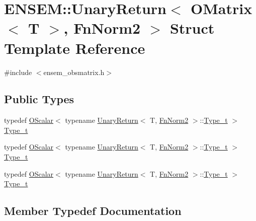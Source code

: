\hypertarget{structENSEM_1_1UnaryReturn_3_01OMatrix_3_01T_01_4_00_01FnNorm2_01_4}{}\section{E\+N\+S\+EM\+:\+:Unary\+Return$<$ O\+Matrix$<$ T $>$, Fn\+Norm2 $>$ Struct Template Reference}
\label{structENSEM_1_1UnaryReturn_3_01OMatrix_3_01T_01_4_00_01FnNorm2_01_4}


{\ttfamily \#include $<$ensem\+\_\+obsmatrix.\+h$>$}

\subsection*{Public Types}
\begin{DoxyCompactItemize}
\item 
typedef \mbox{\hyperlink{classENSEM_1_1OScalar}{O\+Scalar}}$<$ typename \mbox{\hyperlink{structENSEM_1_1UnaryReturn}{Unary\+Return}}$<$ T, \mbox{\hyperlink{structENSEM_1_1FnNorm2}{Fn\+Norm2}} $>$\+::\mbox{\hyperlink{structENSEM_1_1UnaryReturn_3_01OMatrix_3_01T_01_4_00_01FnNorm2_01_4_a4ec82ac7d8a71ef886cafde5b7ecff03}{Type\+\_\+t}} $>$ \mbox{\hyperlink{structENSEM_1_1UnaryReturn_3_01OMatrix_3_01T_01_4_00_01FnNorm2_01_4_a4ec82ac7d8a71ef886cafde5b7ecff03}{Type\+\_\+t}}
\item 
typedef \mbox{\hyperlink{classENSEM_1_1OScalar}{O\+Scalar}}$<$ typename \mbox{\hyperlink{structENSEM_1_1UnaryReturn}{Unary\+Return}}$<$ T, \mbox{\hyperlink{structENSEM_1_1FnNorm2}{Fn\+Norm2}} $>$\+::\mbox{\hyperlink{structENSEM_1_1UnaryReturn_3_01OMatrix_3_01T_01_4_00_01FnNorm2_01_4_a4ec82ac7d8a71ef886cafde5b7ecff03}{Type\+\_\+t}} $>$ \mbox{\hyperlink{structENSEM_1_1UnaryReturn_3_01OMatrix_3_01T_01_4_00_01FnNorm2_01_4_a4ec82ac7d8a71ef886cafde5b7ecff03}{Type\+\_\+t}}
\item 
typedef \mbox{\hyperlink{classENSEM_1_1OScalar}{O\+Scalar}}$<$ typename \mbox{\hyperlink{structENSEM_1_1UnaryReturn}{Unary\+Return}}$<$ T, \mbox{\hyperlink{structENSEM_1_1FnNorm2}{Fn\+Norm2}} $>$\+::\mbox{\hyperlink{structENSEM_1_1UnaryReturn_3_01OMatrix_3_01T_01_4_00_01FnNorm2_01_4_a4ec82ac7d8a71ef886cafde5b7ecff03}{Type\+\_\+t}} $>$ \mbox{\hyperlink{structENSEM_1_1UnaryReturn_3_01OMatrix_3_01T_01_4_00_01FnNorm2_01_4_a4ec82ac7d8a71ef886cafde5b7ecff03}{Type\+\_\+t}}
\end{DoxyCompactItemize}


\subsection{Member Typedef Documentation}
\mbox{\label{structENSEM_1_1UnaryReturn_3_01OMatrix_3_01T_01_4_00_01FnNorm2_01_4_a4ec82ac7d8a71ef886cafde5b7ecff03}} 
